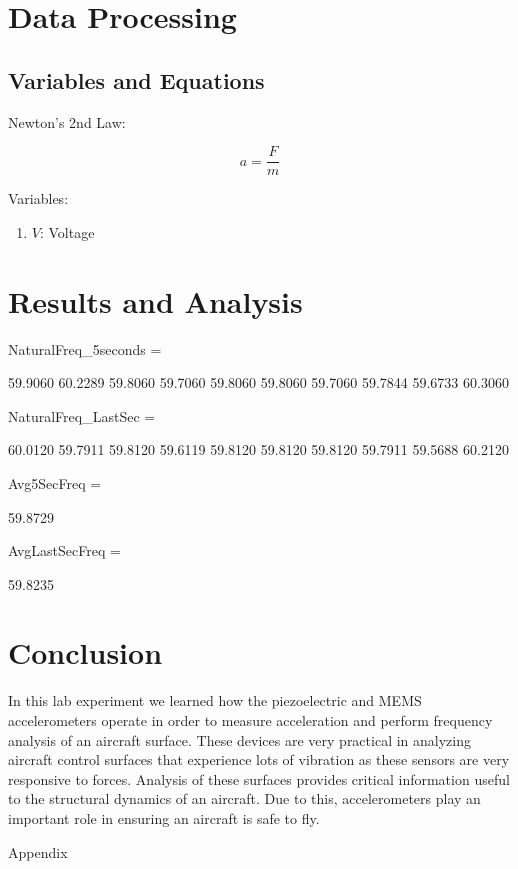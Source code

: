 \documentclass{article}
\begin{document}
\hypertarget{datapro}{}
\section{Data Processing}
\subsection{Variables and Equations}  

Newton's 2nd Law:

\begin{equation}
    a = \dfrac{F}{m}
\end{equation}

Variables:
\begin{enumerate}[label = \Roman*.]
    \item \( V \): Voltage
\end{enumerate}

    
\section{Results and Analysis}


NaturalFreq\_5seconds =

   59.9060   60.2289   59.8060   59.7060   59.8060   59.8060   59.7060   59.7844   59.6733   60.3060


NaturalFreq\_LastSec =

   60.0120   59.7911   59.8120   59.6119   59.8120   59.8120   59.8120   59.7911   59.5688   60.2120


Avg5SecFreq =

   59.8729


AvgLastSecFreq =

   59.8235




\section{Conclusion}
In this lab experiment we learned how the piezoelectric and MEMS accelerometers operate in order to measure acceleration and perform frequency analysis of an aircraft surface. These devices are very practical in analyzing aircraft control surfaces that experience lots of vibration as these sensors are very responsive to forces. Analysis of these surfaces provides critical information useful to the structural dynamics of an aircraft. Due to this, accelerometers play an important role in ensuring an aircraft is safe to fly.

\newpage
\thispagestyle{empty}  %
\begin{center}
	\vspace*{\fill}
	{\Huge Appendix}
	\vspace*{\fill}
\end{center}
\end{document}
